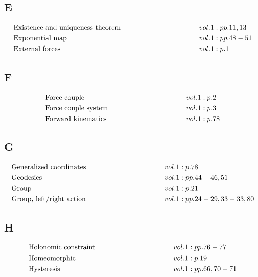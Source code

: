 \documentclass[a4paper]{article}
\begin{document}
\subsection*{E} 
\begin{align*} 
&\text{Existence and uniqueness theorem} \hspace*{10em}&& vol. 1: pp. 11, 13\\
&\text{Exponential map} \hspace*{10em}&& vol. 1: pp. 48-51\\
&\text{External forces} \hspace*{10em}&& vol. 1: p. 1\\
\end{align*} 
\subsection*{F} 
\begin{align*} 
&\text{Force couple} \hspace*{10em}&& vol. 1: p. 2\\
&\text{Force couple system} \hspace*{10em}&& vol. 1: p. 3\\
&\text{Forward kinematics} \hspace*{10em}&& vol. 1: p. 78\\
\end{align*} 
\subsection*{G} 
\begin{align*} 
&\text{Generalized coordinates} \hspace*{10em}&& vol. 1: p. 78\\
&\text{Geodesics} \hspace*{10em}&& vol. 1: pp. 44-46, 51\\
&\text{Group} \hspace*{10em}&& vol. 1: p. 21\\
&\text{Group, left/right action} \hspace*{10em}&& vol. 1: pp. 24-29, 33-33, 80\\
\end{align*} 
\subsection*{H} 
\begin{align*} 
&\text{Holonomic constraint} \hspace*{10em}&& vol. 1: pp. 76-77\\
&\text{Homeomorphic} \hspace*{10em}&& vol. 1: p. 19\\
&\text{Hysteresis} \hspace*{10em}&& vol. 1: pp. 66, 70-71\\
\end{align*} 
\end{document}
